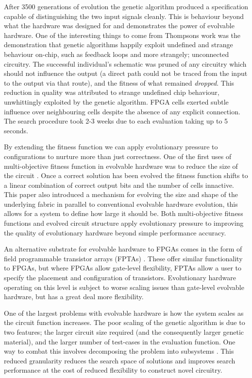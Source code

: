 After 3500 generations of evolution the genetic algorithm produced a specification
capable of distinguishing the two input signals cleanly. This is behaviour beyond
what the hardware was designed for and demonstrates the power of evolvable hardware. One of the
interesting things to come from Thompsons work was the demonstration that genetic
algorithms happily exploit undefined and strange behaviour on-chip, such as feedback
loops and more strangely; unconnected circuitry. The successful
individual's schematic was pruned of any circuitry which should not influence the
output (a direct path could not be traced from the input to the output via that route),
and the fitness of what remained {\em dropped}. This reduction in quality was attributed
to strange undefined chip behaviour, unwhittingly exploited by the genetic algorithm.
FPGA cells exerted subtle influence over neighbouring cells despite the absence of any explicit
connection.
The search procedure took 2-3 weeks
due to each evaluation taking up to 5 seconds.

By extending the fitness function we can apply evolutionary pressure to configurations
to nurture more than just correctness.
One of the first uses of multi-objective fitness function in evolvable hardware was
to reduce the size of the circuit \cite{785435}. Once a correct solution has been evolved the
fitness function shifts to a linear combination of correct output bits and
the number of cells innactive. This paper also introduced a mechanism for evolving the size
and shape of the underlying fabric in parallel to conventional evolvable hardware
evolution, this allows for a system to define
how large it should be.
Both multi-objective fitness functions and evolved circuit structure
apply evolutionary pressure to improving the quality of evolutionary hardware
beyond simple performance accuracy.

An alternative substrate for evolvable hardware to FPGAs comes in the form of field
programmable transistor arrays (FPTAs) \cite{869347}. These offer similar functionality
to FPGAs, but where FPGAs allow gate-level flexibility, FPTAs allow a user to specify
the placement and configuration of transistors. Evolutionary hardware operating on this
level is subject to worse scaling issues than gate-level evolvable hardware, but has a
great deal more flexibility.

One of the largest problems with evolvable hardware is how the system scales as the
circuit function increases. The poor scaling of the genetic algorithm is due to two
features; the larger circuit size required (and the consequently larger genetic material),
and the larger number of test-cases in the evaluation function. One way to combat this
involves decomposing the problem into subsystems \cite{10.1007/978-3-540-46239-2_5}.
This reduced granularity reduces the search space of solutions and improves search
performance at the cost of reduced flexibility to construct novel circuitry.

